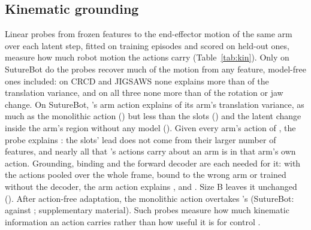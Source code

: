 \subsection{Kinematic grounding}\label{sec:kin}
Linear probes from frozen features to the end-effector motion of the same arm over each latent step, fitted on training episodes and scored on held-out ones, measure how much robot motion the actions carry (Table~\ref{tab:kin}). Only on SutureBot do the probes recover much of the motion from any feature, model-free ones included: on CRCD and JIGSAWS none explains more than  of the translation variance, and on all three none more than  of the rotation or jaw change. On SutureBot, \method{}'s arm action explains  of its arm's translation variance, as much as the monolithic action () but less than the slots () and the latent change inside the arm's region without any model (). Given every arm's action of \method{}, the probe explains : the slots' lead does not come from their larger number of features, and nearly all that \method{}'s actions carry about an arm is in that arm's own action. Grounding, binding and the forward decoder are each needed for it: with the actions pooled over the whole frame, bound to the wrong arm or trained without the decoder, the arm action explains ,  and . Size B leaves it unchanged (). After action-free adaptation, the monolithic action overtakes \method{}'s (SutureBot:  against ; supplementary material). Such probes measure how much kinematic information an action carries rather than how useful it is for control \cite{lamstudy}.

